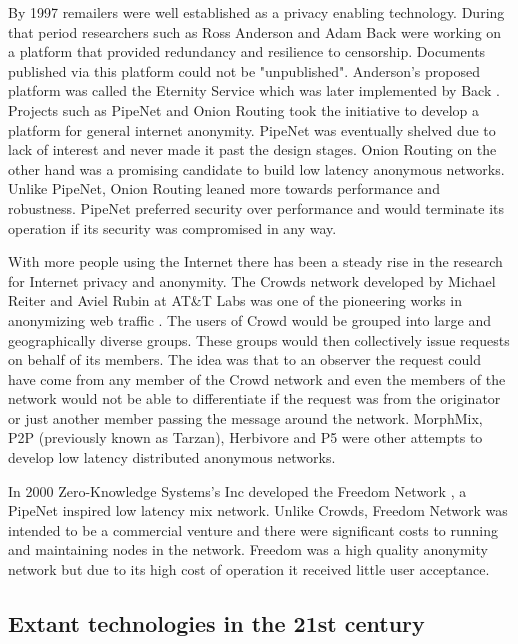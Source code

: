 \documentclass{llncs}
\begin{document}
By 1997 remailers were well established as a privacy enabling technology. During that period researchers such as Ross Anderson and Adam Back were working on a platform that provided redundancy and resilience to censorship. Documents published via this platform could not be "unpublished". Anderson's proposed platform was called the Eternity Service \cite{anderson96eternity} which was later implemented by Back \cite{back:usenet}. Projects such as PipeNet\cite{pipenet10} and Onion Routing \cite{onion-routing:ih96} took the initiative to develop a platform for general internet anonymity. PipeNet was eventually shelved due to lack of interest and never made it past the design stages. Onion Routing on the other hand was a promising candidate to build low latency anonymous networks. Unlike PipeNet, Onion Routing leaned more towards performance and robustness. PipeNet preferred security over performance and would terminate its operation if its security was compromised in any way.

With more people using the Internet there has been a steady rise in the research for Internet privacy and anonymity. The Crowds network developed by Michael Reiter and Aviel Rubin at AT\&T Labs was one of the pioneering works in anonymizing web traffic \cite{crowds:tissec}. The users of Crowd would be grouped into large and geographically diverse groups. These groups would then collectively issue requests on behalf of its members. The idea was that to an observer the request could have come from any member of the Crowd network and even the members of the network would not be able to differentiate if the request was from the originator or just another member passing the message around the network. MorphMix\cite{morphmix:wpes2002}, P2P (previously known as Tarzan)\cite{tarzan:ccs02}, Herbivore\cite{herbivore:tr} and P5\cite{sherwood-protocol} were other attempts to develop low latency distributed anonymous networks.

In 2000 Zero-Knowledge Systems's Inc developed the Freedom Network \cite{freedom2-arch}, a PipeNet inspired low latency mix network. Unlike Crowds, Freedom Network was intended to be a commercial venture and there were significant costs to running and maintaining nodes in the network. Freedom was a high quality anonymity network but due to its high cost of operation it received little user acceptance.

\subsection{Extant technologies in the 21st century} \label{new_proj}
\end{document}
